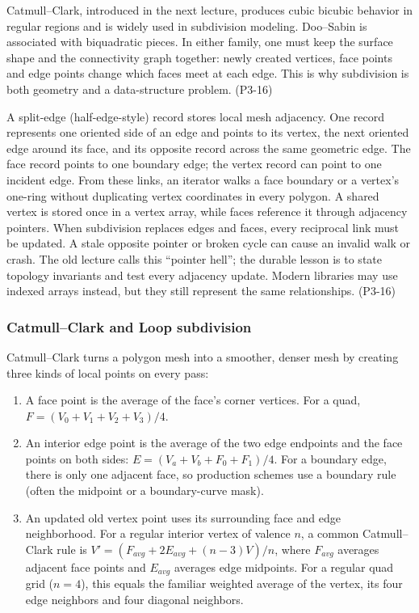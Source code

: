 Catmull--Clark, introduced in the next lecture, produces cubic bicubic behavior in regular regions and is widely used in subdivision modeling. Doo--Sabin is associated with biquadratic pieces. In either family, one must keep the surface shape and the connectivity graph together: newly created vertices, face points and edge points change which faces meet at each edge. This is why subdivision is both geometry and a data-structure problem. (P3-16)

A split-edge (half-edge-style) record stores local mesh adjacency. One record represents one oriented side of an edge and points to its vertex, the next oriented edge around its face, and its opposite record across the same geometric edge. The face record points to one boundary edge; the vertex record can point to one incident edge. From these links, an iterator walks a face boundary or a vertex's one-ring without duplicating vertex coordinates in every polygon. A shared vertex is stored once in a vertex array, while faces reference it through adjacency pointers. When subdivision replaces edges and faces, every reciprocal link must be updated. A stale opposite pointer or broken cycle can cause an invalid walk or crash. The old lecture calls this ``pointer hell''; the durable lesson is to state topology invariants and test every adjacency update. Modern libraries may use indexed arrays instead, but they still represent the same relationships. (P3-16)

\subsubsection{Catmull--Clark and Loop subdivision}\label{03-visual-computing-i-ch002-catmullclark-and-loop-subdivision}

Catmull--Clark turns a polygon mesh into a smoother, denser mesh by creating three kinds of local points on every pass:

\begin{enumerate}
\def\labelenumi{\arabic{enumi}.}
\tightlist
\item
  A face point is the average of the face's corner vertices. For a quad, \(F=(V_0+V_1+V_2+V_3)/4\).
\item
  An interior edge point is the average of the two edge endpoints and the face points on both sides: \(E=(V_a+V_b+F_0+F_1)/4\). For a boundary edge, there is only one adjacent face, so production schemes use a boundary rule (often the midpoint or a boundary-curve mask).
\item
  An updated old vertex point uses its surrounding face and edge neighborhood. For a regular interior vertex of valence \(n\), a common Catmull--Clark rule is \(V'=(F_{avg}+2E_{avg}+(n-3)V)/n\), where \(F_{avg}\) averages adjacent face points and \(E_{avg}\) averages edge midpoints. For a regular quad grid (\(n=4\)), this equals the familiar weighted average of the vertex, its four edge neighbors and four diagonal neighbors.
\end{enumerate}

